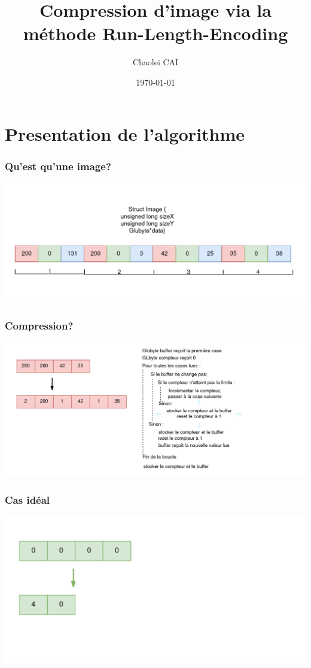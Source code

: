 \documentclass{beamer}
\subtitle{}
\title{Compression d'image via la méthode Run-Length-Encoding}
\institute[Paris 8]{Paris VIII}
\author{Chaolei CAI}
\date{\today}
\begin{document}
    \frame{\titlepage}
    \tableofcontents

    \section{Presentation de l'algorithme}

    \begin{frame}
        \frametitle{Qu'est qu'une image?}
        \includegraphics[width=\linewidth]{img/fig1.png}
    \end{frame}    
    
    \begin{frame}
        \frametitle{Compression?}
        \includegraphics[width=\linewidth]{img/fig2.png}
    \end{frame}
    
    \begin{frame}
        \frametitle{Cas idéal}
        \includegraphics[width=\linewidth]{img/fig3.png}
    \end{frame}
\end{document}
